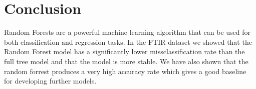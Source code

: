\documentclass[fleqn,moreauthors,10pt]{ds_report}
\begin{document}

\section*{Conclusion}
Random Forests are a powerful machine learning algorithm that can be used for both classification and regression tasks.
In the FTIR dataset we showed that the Random Forest model has a significantly lower missclassification rate than the full tree model and that the model is more stable.
We have also shown that the random forrest produces a very high accuracy rate which gives a good baseline for developing further models.

\end{document}
